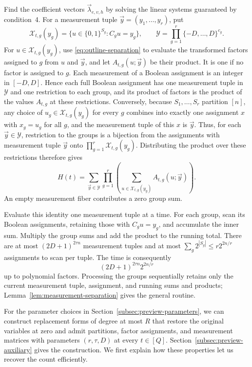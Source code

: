 Find the coefficient vectors $\vec\lambda_{e,v,h}$ by solving the
linear systems guaranteed by condition~4. For a measurement tuple
$\vec y=(y_1,\ldots,y_r)$, put
\[
 \mathcal X_{t,g}(y_g)
 =\{u\in\{0,1\}^{S_g}:C_gu=y_g\},\qquad
 \mathcal Y=\prod_{g=1}^r\{-D,\ldots,D\}^{c_g}.
\]
For $u\in\mathcal X_{t,g}(y_g)$, use \eqref{eq:outline-separation}
to evaluate the transformed factors assigned to $g$ from $u$ and
$\vec y$, and let $A_{t,g}(u;\vec y)$ be their product. It is one if
no factor is assigned to $g$. Each measurement of a Boolean
assignment is an integer in $[-D,D]$. Hence each full Boolean
assignment has one measurement tuple in $\mathcal Y$ and one
restriction to each group, and its product of factors is
the product of the values $A_{t,g}$ at these restrictions.
Conversely, because $S_1,\ldots,S_r$ partition $[n]$, any choice of
$u_g\in\mathcal X_{t,g}(y_g)$ for every $g$ combines into exactly one
assignment $x$ with $x_g=u_g$ for all $g$, and the measurement tuple
of this $x$ is $\vec y$. Thus, for each $\vec y\in\mathcal Y$,
restriction to the groups is a bijection from the assignments with
measurement tuple $\vec y$ onto $\prod_{g=1}^r\mathcal X_{t,g}(y_g)$.
Distributing the product over these restrictions therefore gives
\begin{equation}\label{eq:outline-separated-sum}
 H(t)=\sum_{\vec{y}\in\mathcal Y}\prod_{g=1}^r
       \left(\sum_{u\in\mathcal X_{t,g}(y_g)}
                         A_{t,g}(u;\vec{y})\right).
\end{equation}
An empty measurement fiber contributes a zero group sum.

Evaluate this identity one measurement tuple at a time. For each
group, scan its Boolean assignments, retaining those with $C_gu=y_g$,
and accumulate the inner sum. Multiply the group sums and add the
product to the running total. There are at most
$(2D+1)^{2\tau n}$ measurement tuples and at most
$\sum_g2^{|S_g|}\le r2^{2n/r}$ assignments to scan per tuple.
The time is consequently
\[
 (2D+1)^{2\tau n}2^{2n/r}
\]
up to polynomial factors. Processing the groups sequentially retains
only the current measurement tuple, assignment, and running sums and
products; Lemma~\ref{lem:measurement-separation} gives the general
routine.

For the parameter choices in Section~\ref{subsec:preview-parameters},
we can construct replacement forms of degree at most $R$ that
restore the original variables at zero and admit partitions, factor assignments, and measurement matrices
with parameters $(r,\tau,D)$ at every $t\in[Q]$.
Section~\ref{subsec:preview-auxiliary} gives the construction.
We first explain how these properties let us recover the count
efficiently.

